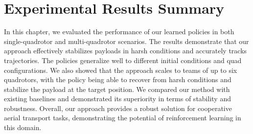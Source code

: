 \section{Experimental Results Summary}
In this chapter, we evaluated the performance of our learned policies in both single-quadrotor and multi-quadrotor scenarios. The results demonstrate that our approach effectively stabilizes payloads in harsh conditions and accurately tracks trajectories. The policies generalize well to different initial conditions and quad configurations. We also showed that the approach scales to teams of up to six quadrotors, with the policy being able to recover from harsh conditions and stabilize the payload at the target position. We compared our method with existing baselines and demonstrated its superiority in terms of stability and robustness. Overall, our approach provides a robust solution for cooperative aerial transport tasks, demonstrating the potential of reinforcement learning in this domain.
